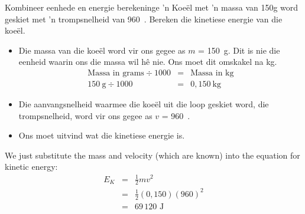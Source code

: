       \noindent
\begin{wex}{Kombineer eenhede en energie berekeninge }{  'n Koe\"{e}l met   'n massa van 150g word geskiet met   'n trompsnelheid van 960~\ms. Bereken die kinetiese energie van die koe\"{e}l.}
{
\begin{itemize}
\item Die massa van die koe\"{e}l word vir ons gegee as $m$ = 150~g. Dit is nie die eenheid waarin ons die massa wil h\^{e} nie. Ons moet dit omskakel na kg.
\begin{eqnarray*}
\text{Massa in grams} \div 1000 &=& \text{Massa in kg}\\
150~\text{g} \div 1000 &=& 0,150~\text{kg}
\end{eqnarray*}

\item Die aanvangsnelheid waarmee die koe\"{e}l uit die loop geskiet word, die trompsnelheid, word vir ons gegee as $v$ = 960~\ms.
\end{itemize}
\begin{itemize}
\item Ons moet uitvind wat die kinetiese energie is.
\end{itemize}

We just substitute the mass and velocity (which are known) into the equation for kinetic energy:
\begin{eqnarray*}
E_{K} & = & \frac{1}{2}mv^2 \\
&= & \frac{1}{2}(0,150)(960)^2 \\
&=& 69\,120 \text{ J}
\end{eqnarray*}}
\end{wex}
    \noindent
\label{m38785*secfhsst!!!underscore!!!id1491}
